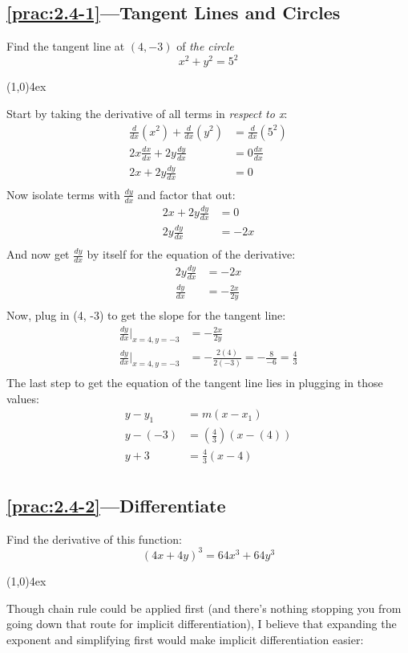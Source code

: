 \documentclass{MathNotes}
\newcommand{\br}{
	\begin{center}
		\line(1,0){4ex}
	\end{center}}
\begin{document}
\subsection*{\ref{prac:2.4-1}---Tangent Lines and Circles}\label{ans:2.4-1}
Find the tangent line at $(4,-3)$ of \textit{the circle}
$$x^2+y^2=5^2$$
\br
Start by taking the derivative of all terms in \textit{respect to x}:
\begin{align*}
	\frac{d}{dx}(x^2)+\frac{d}{dx}(y^2) & =\frac{d}{dx}(5^2) \\
	2x\frac{dx}{dx}+2y\frac{dy}{dx}     & =0\frac{dx}{dx}    \\
	2x+2y\frac{dy}{dx}                  & =0                 \\
\end{align*}
Now isolate terms with $\frac{dy}{dx}$ and factor that out:
\begin{align*}
	2x+2y\frac{dy}{dx} & =0   \\
	2y\frac{dy}{dx}    & =-2x \\
\end{align*}
And now get $\frac{dy}{dx}$ by itself for the equation of the derivative:
\begin{align*}
	2y\frac{dy}{dx} & =-2x            \\
	\frac{dy}{dx}   & =-\frac{2x}{2y} \\
\end{align*}
Now, plug in (4, -3) to get the slope for the tangent line:
\begin{align*}
	\frac{dy}{dx}\Big|_{x=4,y=-3} & =-\frac{2x}{2y}                                \\
	\frac{dy}{dx}\Big|_{x=4,y=-3} & =-\frac{2(4)}{2(-3)}=-\frac{8}{-6}=\frac{4}{3} \\
\end{align*}
The last step to get the equation of the tangent line lies in plugging in those
values:
\begin{align*}
	y-y_1  & =m(x-x_1)             \\
	y-(-3) & =(\frac{4}{3})(x-(4)) \\
	y+3    & =\frac{4}{3}(x-4)     \\
\end{align*}

\newpage
\subsection*{\ref{prac:2.4-2}---Differentiate}\label{ans:2.4-2}
Find the derivative of this function: $$(4x+4y)^3=64x^3+64y^3$$
\br
Though chain rule could be applied first (and there's nothing stopping you from
going down that route for implicit differentiation), I believe that expanding
the exponent and simplifying first would make implicit differentiation easier:
\end{document}
